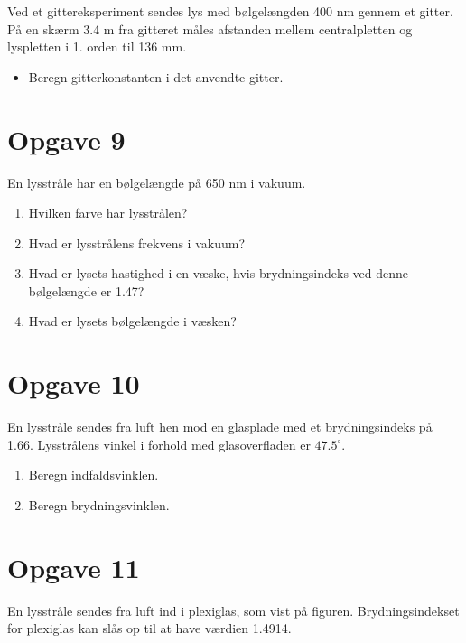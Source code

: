 \documentclass[a4paper, 12pt]{article}
\begin{document}
Ved et gittereksperiment sendes lys med bølgelængden 400 nm gennem et gitter. På en skærm 3.4 m fra gitteret måles afstanden mellem centralpletten og lyspletten i 1. orden til 136 mm.

\begin{itemize}
\item Beregn gitterkonstanten i det anvendte gitter.
\end{itemize}

\section*{Opgave 9}
\label{sec:org9cd7292}

En lysstråle har en bølgelængde på 650 nm i vakuum.

\begin{enumerate}
\item Hvilken farve har lysstrålen?

\item Hvad er lysstrålens frekvens i vakuum?

\item Hvad er lysets hastighed i en væske, hvis brydningsindeks ved denne bølgelængde er 1.47?

\item Hvad er lysets bølgelængde i væsken?
\end{enumerate}

\section*{Opgave 10}
\label{sec:org713f28a}

En lysstråle sendes fra luft hen mod en glasplade med et brydningsindeks på 1.66. Lysstrålens vinkel i forhold med glasoverfladen er \(47.5^{\circ}\).

\begin{enumerate}
\item Beregn indfaldsvinklen.

\item Beregn brydningsvinklen.
\end{enumerate}

\section*{Opgave 11}
\label{sec:orgd8d064b}

En lysstråle sendes fra luft ind i plexiglas, som vist på figuren. Brydningsindekset for plexiglas kan slås op til at have værdien 1.4914.
\end{document}
